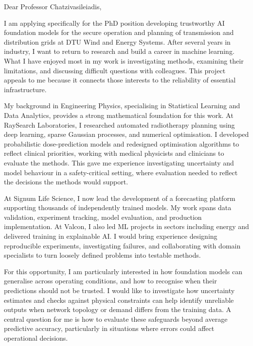 \documentclass[11pt,a4paper]{moderncv}
\begin{document}
\makecvtitle

Dear Professor Chatzivasileiadis,

\vspace*{2em}
I am applying specifically for the PhD position developing trustworthy AI foundation models for the secure operation and planning of transmission and distribution grids at DTU Wind and Energy Systems. After several years in industry, I want to return to research and build a career in machine learning. What I have enjoyed most in my work is investigating methods, examining their limitations, and discussing difficult questions with colleagues. This project appeals to me because it connects those interests to the reliability of essential infrastructure.

\vspace{4pt}
\hspace*{2em}
My background in Engineering Physics, specialising in Statistical Learning and Data Analytics, provides a strong mathematical foundation for this work. At RaySearch Laboratories, I researched automated radiotherapy planning using deep learning, sparse Gaussian processes, and numerical optimisation. I developed probabilistic dose-prediction models and redesigned optimisation algorithms to reflect clinical priorities, working with medical physicists and clinicians to evaluate the methods. This gave me experience investigating uncertainty and model behaviour in a safety-critical setting, where evaluation needed to reflect the decisions the methods would support.

\vspace{4pt}
\hspace*{2em}
At Signum Life Science, I now lead the development of a forecasting platform supporting thousands of independently trained models. My work spans data validation, experiment tracking, model evaluation, and production implementation. At Valcon, I also led ML projects in sectors including energy and delivered training in explainable AI. I would bring experience designing reproducible experiments, investigating failures, and collaborating with domain specialists to turn loosely defined problems into testable methods.

\vspace{4pt}
\hspace*{2em}
For this opportunity, I am particularly interested in how foundation models can generalise across operating conditions, and how to recognise when their predictions should not be trusted. I would like to investigate how uncertainty estimates and checks against physical constraints can help identify unreliable outputs when network topology or demand differs from the training data. A central question for me is how to evaluate these safeguards beyond average predictive accuracy, particularly in situations where errors could affect operational decisions.
\end{document}
